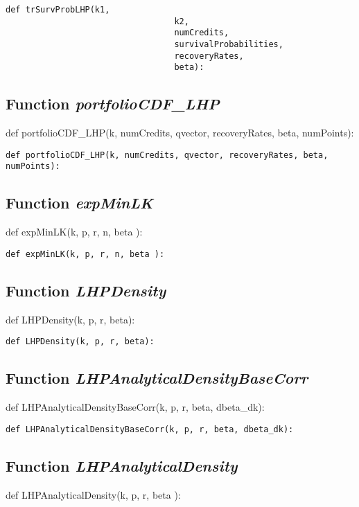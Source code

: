 \documentclass[twoside,11pt]{book}
\begin{document}
\begin{lstlisting}
def trSurvProbLHP(k1, 
                                  k2, 
                                  numCredits, 
                                  survivalProbabilities, 
                                  recoveryRates, 
                                  beta):
\end{lstlisting}

\subsection{Function {\it portfolioCDF\_LHP}}
def portfolioCDF\_LHP(k, numCredits, qvector, recoveryRates, beta, numPoints):

\begin{lstlisting}
def portfolioCDF_LHP(k, numCredits, qvector, recoveryRates, beta, numPoints):
\end{lstlisting}

\subsection{Function {\it expMinLK}}
def expMinLK(k, p, r, n, beta ):

\begin{lstlisting}
def expMinLK(k, p, r, n, beta ):
\end{lstlisting}

\subsection{Function {\it LHPDensity}}
def LHPDensity(k, p, r, beta):

\begin{lstlisting}
def LHPDensity(k, p, r, beta):
\end{lstlisting}

\subsection{Function {\it LHPAnalyticalDensityBaseCorr}}
def LHPAnalyticalDensityBaseCorr(k, p, r, beta, dbeta\_dk):

\begin{lstlisting}
def LHPAnalyticalDensityBaseCorr(k, p, r, beta, dbeta_dk):
\end{lstlisting}

\subsection{Function {\it LHPAnalyticalDensity}}
def LHPAnalyticalDensity(k, p, r, beta ):
\end{document}
